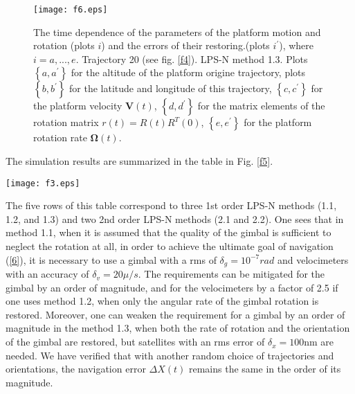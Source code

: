 \documentclass[twocolumn,showpacs,preprintnumbers]{revtex4}
\begin{document}
\begin{figure}[!t]
\texttt{[image: f6.eps]}
\caption{The time dependence of the parameters of the platform motion and rotation
(plots $i$) and the errors of their restoring.(plots $i^{\prime }$), where $%
i=a,...,e$. Trajectory 20 (see fig. \protect\ref{f4}). LPS-N method 1.3.
Plots $\left\{ a,a^{\prime }\right\} $ for the altitude of the platform
origine trajectory, plots $\left\{ b,b^{\prime }\right\} $ for the latitude
and longitude of this trajectory, $\left\{ c,c^{\prime }\right\} $ for the
platform velocity $\mathbf{V}\left( t\right) $, $\left\{ d,d^{\prime
}\right\} $ for the matrix elements of the rotation matrix $r\left( t\right)
=R\left( t\right) R^{T}\left( 0\right) $, $\left\{ e,e^{\prime }\right\} $
for the platform rotation rate $\mathbf{\Omega }\left( t\right) .$}
\label{f6}
\end{figure}

The simulation results are summarized in the table in Fig. \ref{f5}.

\begin{figure*}[t]
\texttt{[image: f3.eps]}
\caption{Five LPS-N methods. Results of
simulations. For the same 30 trajectories as in FIG. \protect\ref{f1} one
generated a navigation process. This was done for 11 sets of pseudo-random
errors of satellites and velocimeters. As a result, one has ensemble of 330 $%
\Delta X\left( t\right) -$dependences. The average over this ensemble errors
for $t_{n}=1$hour of the navigation are shown by red dots in the 4th column.
In the same plots, the blue, green and black dots show the maximum and
minimum values of the error and SD for the entire ensemble, respectively.
The $\Delta X\left( t\right) -$dependences for 30 platform trajectories with
a given set of sensors' errors are shown in the 2nd and 3rd columns. They
contain plots for those sets of sensor errors at which one of the $\Delta
X\left( t\right) $ curves reaches the minimum (best) or maximum (worst)
value of $\Delta X\left( t_{n}\right) $. \label{f5}  }
\end{figure*}

The five rows of this table correspond to three 1st order LPS-N methods
(1.1, 1.2, and 1.3) and two 2nd order LPS-N methods (2.1 and 2.2). One sees
that in method 1.1, when it is assumed that the quality of the gimbal is
sufficient to neglect the rotation at all, in order to achieve the ultimate
goal of navigation (\ref{6}), it is necessary to use a gimbal with a rms of $%
\delta _{g}=10^{-7}rad$ and velocimeters with an accuracy of $\delta
_{v}=20\mu /s$. The requirements can be mitigated for the gimbal by an order
of magnitude, and for the velocimeters by a factor of 2.5 if one uses method
1.2, when only the angular rate of the gimbal rotation is restored.
Moreover, one can weaken the requirement for a gimbal by an order of
magnitude in the method 1.3, when both the rate of rotation and the
orientation of the gimbal are restored, but satellites with an rms error of $%
\delta _{x}=100$nm are needed. We have verified that with another random
choice of trajectories and orientations, the navigation error $\Delta
X\left( t\right) $ remains the same in the order of its magnitude.
\end{document}
